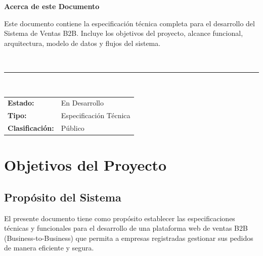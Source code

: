 \documentclass[12pt,a4paper,oneside]{book}
\newcommand{\HRule}{\rule{\linewidth}{0.5mm}}
\begin{document}
\clearpage
\thispagestyle{empty}
\vspace*{5cm}
\begin{center}
    \textbf{\Large Acerca de este Documento}\\[1cm]
    
    \begin{minipage}{0.8\textwidth}
        Este documento contiene la especificación técnica completa para el desarrollo 
        del Sistema de Ventas B2B. Incluye los objetivos del proyecto, alcance funcional, 
        arquitectura, modelo de datos y flujos del sistema.
    \end{minipage}\\[2cm]
    
    \HRule\\[1cm]
    \begin{tabular}{p{5cm}p{8cm}}
        \textbf{Estado:} & En Desarrollo \\
        \textbf{Tipo:} & Especificación Técnica \\
        \textbf{Clasificación:} & Público
    \end{tabular}
\end{center}

\clearpage
\tableofcontents
\clearpage

\chapter{Objetivos del Proyecto}
\label{cap:objetivos}

\section{Propósito del Sistema}
El presente documento tiene como propósito establecer las especificaciones técnicas 
y funcionales para el desarrollo de una plataforma web de ventas B2B (Business-to-Business) 
que permita a empresas registradas gestionar sus pedidos de manera eficiente y segura.
\end{document}
